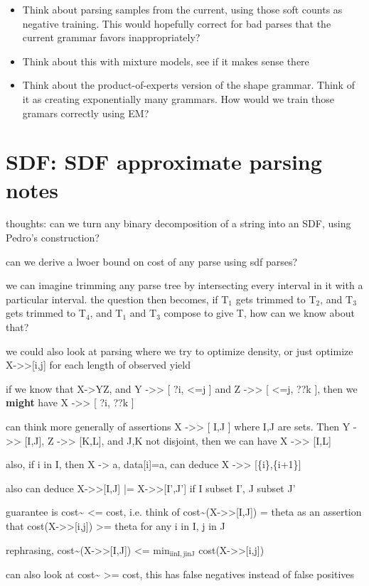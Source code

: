 \documentclass{book}
\begin{document}
\begin{itemize}
\item Think about parsing samples from the current, using those soft
    counts as negative training. This would hopefully correct for bad
    parses that the current grammar favors inappropriately?
\item Think about this with mixture models, see if it makes sense there
\item Think about the product-of-experts version of the shape
    grammar. Think of it as creating exponentially many grammars. How
    would we train those gramars correctly using EM?
\end{itemize}
\section{SDF: SDF approximate parsing notes}
\label{sec-7_26}

thoughts: can we turn any binary decomposition of a string into an
SDF, using Pedro's construction?

can we derive a lwoer bound on cost of any parse using sdf parses?

we can imagine trimming any parse tree by intersecting every interval
in it with a particular interval. the question then becomes, if T$_1$
gets trimmed to T$_2$, and T$_3$ gets trimmed to T$_4$, and T$_1$ and T$_3$
compose to give T, how can we know about that?

we could also look at parsing where we try to optimize density, or
just optimize X->>[i,j] for each length of observed yield

if we know that X->YZ, and
Y ->> [ ?i, <=j ] and Z ->> [ <=j, ??k ], then we \textbf{might} have X ->> [ ?i, ??k ]

can think more generally of assertions X ->> [ I,J ] where I,J are
sets. Then Y ->> [I,J], Z ->> [K,L], and J,K not disjoint, then we can have X ->> [I,L]

also, if i in I, then X -> a, data[i]=a, can deduce X ->> [\{i\},\{i+1\}]

also can deduce X->>[I,J] |= X->>[I',J'] if I subset I', J subset J'

guarantee is cost\~{} <= cost, i.e.
think of cost\~{}(X->>[I,J]) = theta as an assertion that cost(X->>[i,j]) >= theta for any i in I, j in J

rephrasing, cost\~{}(X->>[I,J]) <= min$_{\mathrm{i in I, j in J}}$ cost(X->>[i,j])

can also look at cost\~{} >= cost, this has false negatives instead of false positives
\end{document}
